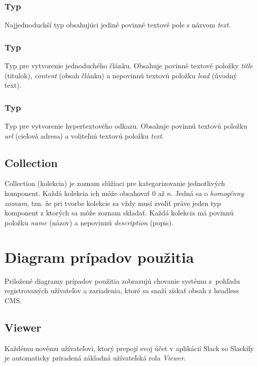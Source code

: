 \subsubsection{Typ }
Najjednoduchší typ obsahujúci jediné povinné textové pole s názvom \emph{text}.

\subsubsection{Typ }
Typ pre vytvorenie jednoduchého článku. Obsahuje povinné textové položky \emph{title} (titulok), \emph{content} (obsah článku) a nepovinnú textovú položku \emph{lead} (úvodný text).

\subsubsection{Typ }
Typ pre vytvorenie hypertextového odkazu. Obsahuje povinnú textovú položku \emph{url} (cieľová adresa) a voliteľnú textovú položku \emph{text}.

\subsection{Collection}
\label{design:collection}
Collection (kolekcia) je zoznam slúžiaci pre kategorizovanie jednotlivých komponent. Každá kolekcia ich môže obsahovať 0 až $n$. Jedná sa o \emph{homogénny zoznam}, tzn. že pri tvorbe kolekcie sa vždy musí zvoliť práve jeden typ komponent z ktorých sa môže zoznam skladať. Každá kolekcia má povinnú položku \emph{name} (názov) a nepovinnú \emph{description} (popis).

\section{Diagram prípadov použitia}
\label{design:use_case}
Priložené diagramy prípadov použitia zobrazujú chovanie systému z~pohľadu registrovaných užívateľov a zariadenia, ktoré sa snaží získať obsah z headless CMS.

\subsection{Viewer}
Každému novému užívateľovi, ktorý prepojí svoj účet v aplikácií Slack so Slackify je automaticky priradená základná užívateľská rola \emph{Viewer}. \\

